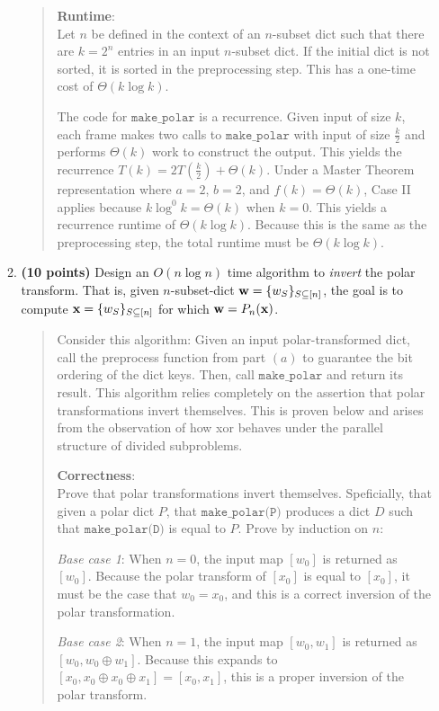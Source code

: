 \documentclass[11pt]{article}
\newcommand{\code}[1]{$\texttt{#1}$}
\begin{document}
\begin{enumerate}
\begin{enumerate}
\begin{quote}
    \medskip
    \textbf{Runtime}: \\ 
    Let $n$ be defined in the context of an $n$-subset dict such that there are $k = 2^n$ entries in an input $n$-subset dict. If the initial dict is not sorted, it is sorted in the preprocessing step. This has a one-time cost of $\Theta(k \log k)$. 

    \medskip
    The code for \code{make\_polar} is a recurrence. Given input of size $k$, each frame makes two calls to \code{make\_polar} with input of size $\frac{k}{2}$ and performs $\Theta(k)$ work to construct the output. This yields the recurrence $T(k) = 2T(\frac{k}{2}) + \Theta(k)$. Under a Master Theorem representation where $a = 2$, $b = 2$, and $f(k) = \Theta(k)$, Case II applies because $k \log^0 k = \Theta(k)$ when $k = 0$. This yields a recurrence runtime of $\Theta(k \log k)$. Because this is the same as the preprocessing step, the total runtime must be $\Theta(k \log k)$.
    \end{quote}
    \item
    {\bf (10 points)}
    Design an $O(n \log n)$ time algorithm to \emph{invert} the polar transform. That is, given $n$-subset-dict ${\bf w} = \{w_S\}_{S\subseteq[n]}$, the goal is to compute ${\bf x} = \{w_S\}_{S\subseteq[n]}$ for which  
    ${\bf w} = P_n({\bf x})$. 
    \begin{quote}
      \color{purple}
      Consider this algorithm: Given an input polar-transformed dict, call the preprocess function from part $(a)$ to guarantee the bit ordering of the dict keys. Then, call \code{make\_polar} and return its result. This algorithm relies completely on the assertion that polar transformations invert themselves. This is proven below and arises from the observation of how xor behaves under the parallel structure of divided subproblems.

      \medskip
      \textbf{Correctness}: \\ 
      Prove that polar transformations invert themselves. Speficially, that given a polar dict $P$, that \code{make\_polar(P)} produces a dict $D$ such that \code{make\_polar(D)} is equal to $P$. Prove by induction on $n$:

      \medskip
      \textit{Base case 1}: When $n = 0$, the input map $[w_0]$ is returned as $[w_0]$. Because the polar transform of $[x_0]$ is equal to $[x_0]$, it must be the case that $w_0 = x_0$, and this is a correct inversion of the polar transformation. 

      \medskip
      \textit{Base case 2}: When $n = 1$, the input map $[w_0, w_1]$ is returned as $[w_0, w_0 \oplus w_1]$. Because this expands to $[x_0, x_0 \oplus x_0 \oplus x_1] = [x_0, x_1]$, this is a proper inversion of the polar transform.


\end{quote}
\end{enumerate}
\end{enumerate}
\end{document}
